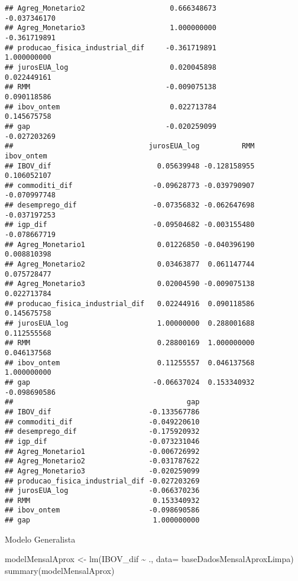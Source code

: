 \documentclass[
]{article}
\newenvironment{Shaded}{\begin{snugshade}}{\end{snugshade}}
\newcommand{\AttributeTok}[1]{\textcolor[rgb]{0.77,0.63,0.00}{#1}}
\newcommand{\FunctionTok}[1]{\textcolor[rgb]{0.00,0.00,0.00}{#1}}
\newcommand{\NormalTok}[1]{#1}
\newcommand{\OtherTok}[1]{\textcolor[rgb]{0.56,0.35,0.01}{#1}}
\newcommand{\SpecialCharTok}[1]{\textcolor[rgb]{0.00,0.00,0.00}{#1}}
\begin{document}
\begin{verbatim}
## Agreg_Monetario2                    0.666348673                   -0.037346170
## Agreg_Monetario3                    1.000000000                   -0.361719891
## producao_fisica_industrial_dif     -0.361719891                    1.000000000
## jurosEUA_log                        0.020045898                    0.022449161
## RMM                                -0.009075138                    0.090118586
## ibov_ontem                          0.022713784                    0.145675758
## gap                                -0.020259099                   -0.027203269
##                                jurosEUA_log          RMM   ibov_ontem
## IBOV_dif                         0.05639948 -0.128158955  0.106052107
## commoditi_dif                   -0.09628773 -0.039790907 -0.070997748
## desemprego_dif                  -0.07356832 -0.062647698 -0.037197253
## igp_dif                         -0.09504682 -0.003155480 -0.078667719
## Agreg_Monetario1                 0.01226850 -0.040396190  0.008810398
## Agreg_Monetario2                 0.03463877  0.061147744  0.075728477
## Agreg_Monetario3                 0.02004590 -0.009075138  0.022713784
## producao_fisica_industrial_dif   0.02244916  0.090118586  0.145675758
## jurosEUA_log                     1.00000000  0.288001688  0.112555568
## RMM                              0.28800169  1.000000000  0.046137568
## ibov_ontem                       0.11255557  0.046137568  1.000000000
## gap                             -0.06637024  0.153340932 -0.098690586
##                                         gap
## IBOV_dif                       -0.133567786
## commoditi_dif                  -0.049220610
## desemprego_dif                 -0.175920932
## igp_dif                        -0.073231046
## Agreg_Monetario1               -0.006726992
## Agreg_Monetario2               -0.031787622
## Agreg_Monetario3               -0.020259099
## producao_fisica_industrial_dif -0.027203269
## jurosEUA_log                   -0.066370236
## RMM                             0.153340932
## ibov_ontem                     -0.098690586
## gap                             1.000000000
\end{verbatim}

Modelo Generalista

\begin{Shaded}
\begin{Highlighting}[]
\NormalTok{modelMensalAprox }\OtherTok{\textless{}{-}} \FunctionTok{lm}\NormalTok{(IBOV\_dif }\SpecialCharTok{\textasciitilde{}}\NormalTok{ ., }\AttributeTok{data=}\NormalTok{ baseDadosMensalAproxLimpa)}
\FunctionTok{summary}\NormalTok{(modelMensalAprox)}
\end{Highlighting}
\end{Shaded}
\end{document}
